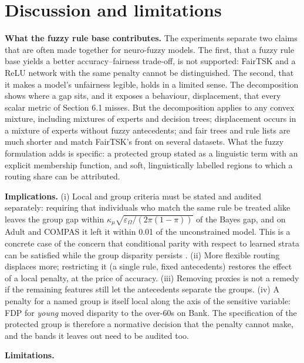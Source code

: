 \hypertarget{discussion-and-limitations}{%
\section{Discussion and limitations}\label{discussion-and-limitations}}

\textbf{What the fuzzy rule base contributes.} The experiments separate two claims that are often made together for neuro-fuzzy models. The first, that a fuzzy rule base yields a better accuracy--fairness trade-off, is not supported: FairTSK and a ReLU network with the same penalty cannot be distinguished. The second, that it makes a model's unfairness legible, holds in a limited sense. The decomposition shows where a gap sits, and it exposes a behaviour, displacement, that every scalar metric of Section 6.1 misses. But the decomposition applies to any convex mixture, including mixtures of experts and decision trees; displacement occurs in a mixture of experts without fuzzy antecedents; and fair trees and rule lists are much shorter and match FairTSK's front on several datasets. What the fuzzy formulation adds is specific: a protected group stated as a linguistic term with an explicit membership function, and soft, linguistically labelled regions to which a routing share can be attributed.

\textbf{Implications.} (i) Local and group criteria must be stated and audited separately: requiring that individuals who match the same rule be treated alike leaves the group gap within \(\kappa_\mu\sqrt{\varepsilon_\Omega/(2\pi(1-\pi))}\) of the Bayes gap, and on Adult and COMPAS it left it within 0.01 of the unconstrained model. This is a concrete case of the concern that conditional parity with respect to learned strata can be satisfied while the group disparity persists \cite{lipton,kearns}. (ii) More flexible routing displaces more; restricting it (a single rule, fixed antecedents) restores the effect of a local penalty, at the price of accuracy. (iii) Removing proxies is not a remedy if the remaining features still let the antecedents separate the groups. (iv) A penalty for a named group is itself local along the axis of the sensitive variable: FDP for \emph{young} moved disparity to the over-60s on Bank. The specification of the protected group is therefore a normative decision that the penalty cannot make, and the bands it leaves out need to be audited too.

\textbf{Limitations.}


